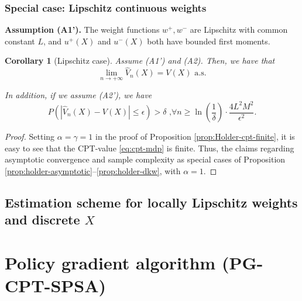 \documentclass[11pt,letterpaper,english]{article}
\newtheorem{corollary}[theorem]{Corollary}
\begin{document}
\subsubsection*{Special case: Lipschitz continuous weights}
\textbf{Assumption (A1').}  The weight functions $w^+, w^-$ are Lipschitz with common constant $L$, and 
$u^+(X)$ and $u^-(X)$ both have bounded first moments.\\[1ex]

\begin{corollary}[Lipschitz case]
Assume (A1') and (A2). Then, we have that 
$$\lim_{n\rightarrow +\infty} \hat V_n(X) = V(X) \text{   a.s.}$$

In addition, if we assume (A2'), we have 
$$
P(\left |\hat V_n(X)- V(X) \right| \leq  \epsilon ) > \delta\text{     ,} \forall n \geq \ln(\frac{1}{\delta})\cdot 
\frac{4L^2 M^2}{\epsilon^{2}}.
$$
\end{corollary}
\begin{proof}
 Setting $\alpha=\gamma=1$ in the proof of Proposition \ref{prop:Holder-cpt-finite}, it is easy to see that the CPT-value \eqref{eq:cpt-mdp} is finite. Thus, the claims regarding asymptotic convergence and sample complexity as special cases of Proposition \ref{prop:holder-asymptotic}--\ref{prop:holder-dkw}, with $\alpha=1$. 
\end{proof}



\subsection{Estimation scheme for locally Lipschitz weights and discrete $X$}

\section{Policy gradient algorithm (PG-CPT-SPSA)}
\label{sec:1spsa}
\end{document}
